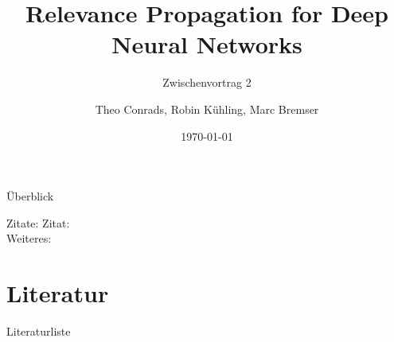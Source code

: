 \documentclass[t, compress]{beamer}
\title{Relevance Propagation for Deep Neural Networks}
\subtitle{Zwischenvortrag 2}
\author{Theo Conrads, Robin K\"uhling, Marc Bremser}
\date{\today}
\begin{document}
\begin{frame}
	\titlepage
\end{frame}

\begin{frame}{Überblick}
  \tableofcontents[hideallsubsections]
\end{frame}



\begin{frame}{Zitate:}
Zitat: \cite{binder} \\
Weiteres: \cite{montavon}
\end{frame}

\section{Literatur}

\begin{frame}{Literaturliste}
\color{unikoelndarkgray}
%





\end{frame}
\end{document}
